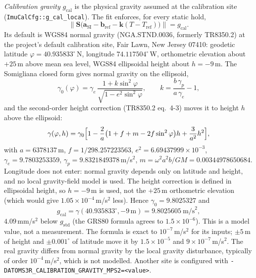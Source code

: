 \documentclass[conference]{IEEEtran}
\begin{document}
    \emph{Calibration gravity} $g_\text{cal}$ is the physical gravity assumed
    at the calibration site (\texttt{ImuCalCfg::g\_cal\_local}). The fit
    enforces, for every static hold,
    \begin{equation}
        \bigl\|\mathbf{S}\bigl(\mathbf{a}_\text{SI} - \mathbf{b}_\text{ref}
        - \mathbf{k}(T - T_\text{ref})\bigr)\bigr\| = g_\text{cal}.
        \label{eq:gravity_constraint}
    \end{equation}
    Its default is WGS84 normal gravity (NGA.STND.0036, formerly TR8350.2)
    at the project's default calibration site, Fair Lawn, New Jersey 07410:
    geodetic latitude $\varphi = 40.935833^\circ$\,N, longitude
    $74.117504^\circ$\,W, orthometric elevation about $+25$\,m above mean
    sea level, WGS84 ellipsoidal height about $h = -9$\,m. The Somigliana
    closed form gives normal gravity on the ellipsoid,
    \begin{equation}
        \gamma_0(\varphi) = \gamma_e\,
        \frac{1 + k\sin^2\varphi}{\sqrt{1 - e^2\sin^2\varphi}},
        \qquad k = \frac{b\,\gamma_p}{a\,\gamma_e} - 1,
    \end{equation}
    and the second-order height correction (TR8350.2 eq.~4-3) moves it to
    height $h$ above the ellipsoid:
    \begin{equation}
        \gamma(\varphi, h) = \gamma_0\Bigl[1 - \frac{2}{a}
        \bigl(1 + f + m - 2f\sin^2\varphi\bigr)h + \frac{3}{a^2}h^2\Bigr],
    \end{equation}
    with $a = 6378137$\,m, $f = 1/298.257223563$, $e^2 = 6.69437999\times
    10^{-3}$, $\gamma_e = 9.7803253359$, $\gamma_p = 9.8321849378$\,m/s$^2$,
    $m = \omega^2a^2b/GM = 0.00344978650684$. Longitude does not enter:
    normal gravity depends only on latitude and height, and no local
    gravity-field model is used. The height correction is defined in
    ellipsoidal height, so $h = -9$\,m is used, not the $+25$\,m
    orthometric elevation (which would give $1.05\times10^{-4}$\,m/s$^2$
    less). Hence $\gamma_0 = 9.8025327$ and
    \[
        g_\text{cal} = \gamma(40.935833^\circ, -9\,\text{m})
        = 9.8025605\ \text{m/s}^2,
    \]
    $4.09$\,mm/s$^2$ below $g_\text{std}$ (the GRS80 formula agrees to
    $1.5\times10^{-6}$). This is a model value, not a measurement. The
    formula is exact to $10^{-7}$\,m/s$^2$ for its inputs; $\pm5$\,m of
    height and $\pm0.001^\circ$ of latitude move it by $1.5\times10^{-5}$
    and $9\times10^{-7}$\,m/s$^2$. The real gravity differs from normal
    gravity by the local gravity disturbance, typically of order
    $10^{-4}$\,m/s$^2$, which is not modelled. Another site is configured
    with \texttt{-DATOMS3R\_CALIBRATION\_GRAVITY\_MPS2=<value>}.
\end{document}
